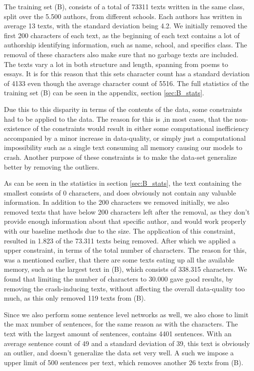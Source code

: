 The training set (B), consists of a total of 73311 texts written in the same
class, split over the 5.500 authors, from different schools. Each authors has
written in average 13 texts, with the standard deviation being 4.2. We initially
removed the first 200 characters of each text, as the beginning of each text
contains a lot of authorship identifying information, such as name, school, and
specifics class. The removal of these characters also make sure that no garbage
texts are included. The texts vary a lot in both structure and length, spanning
from poems to essays. It is for this reason that this sets character count has
a standard deviation of 4133 even though the average character count of 5516.
The full statistics of the training set (B) can be seen in the appendix, section
\ref{sec:B_stats}.

Due this to this disparity in terms of the contents of the data, some
constraints had to be applied to the data. The reason for this is ,in most
cases, that the non-existence of the constraints would result in either some
computational inefficiency accompanied by a minor increase in data-quality, or
simply just a computational impossibility such as a single text consuming all
memory causing our models to crash. Another purpose of these constraints is to
make the data-set generalize better by removing the outliers.

As can be seen in the statistics in section \ref{sec:B_stats}, the text
containing the smallest consists of 0 characters, and does obviously not
contain any valuable information. In addition to the 200 characters we removed
initially, we also removed texts that have below 200 characters left after the
removal, as they don't provide enough information about that specific author,
and would work properly with our baseline methods due to the size.
The application of this constraint, resulted in 1.823 of the 73.311 texts
being removed. After which we applied a upper constraint, in terms of the total
number of characters. The reason for this, was a mentioned earlier, that there
are some texts eating up all the available memory, such as the largest text in
(B), which consists of 338.315 characters. We found that limiting the number of
characters to 30.000 gave good results, by removing the crash-inducing texts,
without affecting the overall data-quality too much, as this only removed 119
texts from (B).

Since we also perform some sentence level networks as well, we also chose to
limit the max number of sentences, for the same reason as with the characters.
The text with the largest amount of sentences, contains 4401 sentences. With
an average sentence count of 49 and a standard deviation of 39, this text is
obviously an outlier, and doesn't generalize the data set very well. A such we
impose a upper limit of 500 sentences per text, which removes another 26 texts
from (B).

